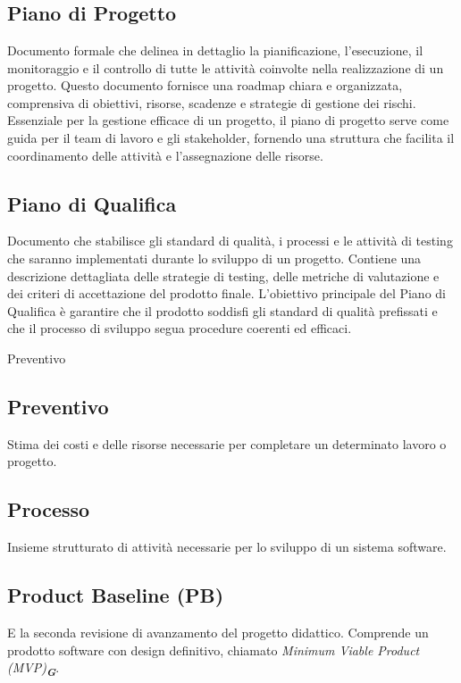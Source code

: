 
\section{}

\subsection*{Piano di Progetto}
Documento formale che delinea in dettaglio la pianificazione, l’esecuzione, il monitoraggio e il controllo di tutte le attività coinvolte nella 
realizzazione di un progetto. Questo documento fornisce una roadmap chiara e organizzata, comprensiva di obiettivi, risorse, scadenze e strategie di 
gestione dei rischi. Essenziale per la gestione efficace di un progetto, il piano di progetto serve come guida per il team di lavoro e gli stakeholder, 
fornendo una struttura che facilita il coordinamento delle attività e l’assegnazione delle risorse.

\subsection*{Piano di Qualifica}
Documento che stabilisce gli standard di qualità, i processi e le attività di testing che saranno implementati durante lo sviluppo di un progetto. 
Contiene una descrizione dettagliata delle strategie di testing, delle metriche di valutazione e dei criteri di accettazione del prodotto finale. 
L’obiettivo principale del Piano di Qualifica è garantire che il prodotto soddisfi gli standard di qualità prefissati e che il processo di sviluppo 
segua procedure coerenti ed efficaci.

\hypertarget{sec:preventivo}{Preventivo}
\subsection*{Preventivo}
Stima dei costi e delle risorse necessarie per completare un determinato lavoro o progetto.

\hypertarget{sec:processo}{}
\subsection*{Processo}
Insieme strutturato di attività necessarie per lo sviluppo di un sistema software.

\hypertarget{sec:PB}{}
\subsection*{Product Baseline (PB)}
E la seconda revisione di avanzamento del progetto didattico. Comprende un prodotto software con design definitivo, 
chiamato \emph{Minimum Viable Product (MVP)}\textsubscript{\textit{\textbf{G}}}.

